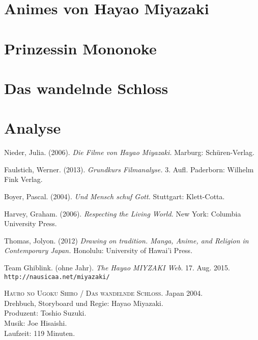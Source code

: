 \documentclass[a4paper]{article}
\begin{document}
\section{Animes von Hayao Miyazaki}


\section{Prinzessin Mononoke}


\section{Das wandelnde Schloss}


\section{Analyse}




\newpage
\begin{thebibliography}{9}

	Nieder, Julia. 
	(2006). 
	\emph{Die Filme von Hayao Miyazaki.}
	Marburg: Schüren-Verlag.

	Faulstich, Werner.
	(2013).
	\emph{Grundkurs Filmanalyse.} 
	3. Aufl. 
	Paderborn: Wilhelm Fink Verlag.

	Boyer, Pascal.
	(2004).
	\emph{Und Mensch schuf Gott.}
	Stuttgart: Klett-Cotta.

	Harvey, Graham.
	(2006).
	\emph{Respecting the Living World.}
	New York: Columbia University Press.

	Thomas, Jolyon.
	(2012)
	\emph{Drawing on tradition. Manga, Anime, and Religion in Contemporary Japan.}
	Honolulu: University of Hawai'i Press.

	Team Ghiblink. 
	(ohne Jahr). 
	\emph{The Hayao MIYZAKI Web}. 
	17. Aug. 2015. 
	\texttt{http://nausicaa.net/miyazaki/}

	\textsc{Hauro no Ugoku Shiro / Das wandelnde Schloss}.
	Japan 2004. \\
	Drehbuch, Storyboard und Regie: Hayao Miyazaki.\\
	Produzent: Toshio Suzuki. \\
	Musik: Joe Hisaishi. \\
	Laufzeit: 119 Minuten. \\

\end{thebibliography}
\end{document}
